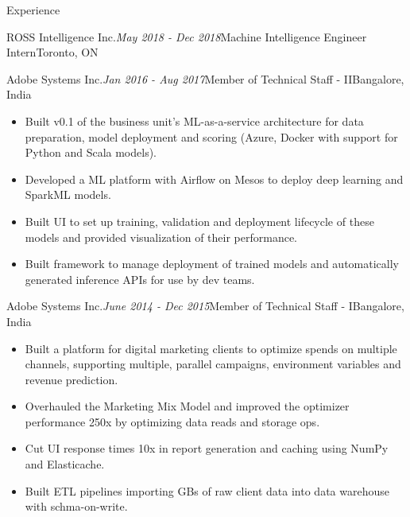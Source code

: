 \documentclass{resume} %
\begin{document}
\begin{rSection}{Experience}
\begin{rSubsection}{ROSS Intelligence Inc.}{\em May 2018 - Dec 2018}{Machine Intelligence Engineer Intern}{Toronto, ON}
\end{rSubsection}

\begin{rSubsection}{Adobe Systems Inc.}{\em Jan 2016 - Aug 2017}{Member of Technical Staff - II}{Bangalore, India}
\vspace{-1mm}
\begin{itemize}
    \item Built v0.1 of the business unit's ML-as-a-service architecture for data preparation, model deployment and scoring (Azure, Docker with support for Python and Scala models).
    \item Developed a ML platform with Airflow on Mesos to deploy deep learning and SparkML models.
    \item Built UI to set up training, validation and deployment lifecycle of these models and provided visualization of their performance.
    \item Built framework to manage deployment of trained models and automatically generated inference APIs for use by dev teams.
\end{itemize}
\end{rSubsection}

\begin{rSubsection}{Adobe Systems Inc.}{\em June 2014 - Dec 2015}{Member of Technical Staff - I}{Bangalore, India}
\vspace{-1mm}
\begin{itemize}
    \item Built a platform for digital marketing clients to optimize spends on multiple channels, supporting multiple, parallel campaigns, 
    environment variables and revenue prediction.
    \item Overhauled the Marketing Mix Model and improved the optimizer performance 250x by optimizing data reads and storage ops.
    \item Cut UI response times 10x in report generation and caching using NumPy and Elasticache.
    \item Built ETL pipelines importing GBs of raw client data into data warehouse with schma-on-write.
\end{itemize}
\end{rSubsection}

\end{rSection}
\end{document}
